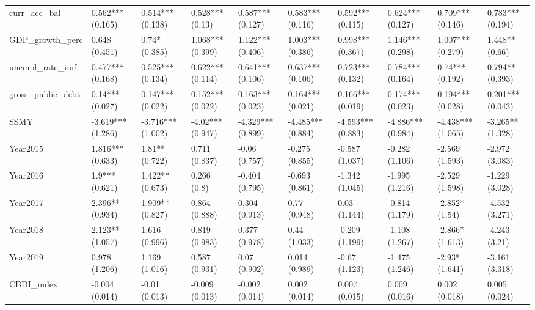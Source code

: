 \begin{table}[ht]
\begin{tabular}{llllllllll}
  curr\_acc\_bal & 0.562*** (0.165) & 0.514*** (0.138) & 0.528*** (0.13) & 0.587*** (0.127) & 0.583*** (0.116) & 0.592*** (0.115) & 0.624*** (0.127) & 0.709*** (0.146) & 0.783*** (0.194) \\ 
  GDP\_growth\_perc & 0.648 (0.451) & 0.74* (0.385) & 1.068*** (0.399) & 1.122*** (0.406) & 1.003*** (0.386) & 0.998*** (0.367) & 1.146*** (0.298) & 1.007*** (0.279) & 1.448** (0.66) \\ 
  unempl\_rate\_imf & 0.477*** (0.168) & 0.525*** (0.134) & 0.622*** (0.114) & 0.641*** (0.106) & 0.637*** (0.106) & 0.723*** (0.132) & 0.784*** (0.164) & 0.74*** (0.192) & 0.794** (0.393) \\ 
  gross\_public\_debt & 0.14*** (0.027) & 0.147*** (0.022) & 0.152*** (0.022) & 0.163*** (0.023) & 0.164*** (0.021) & 0.166*** (0.019) & 0.174*** (0.023) & 0.194*** (0.028) & 0.201*** (0.043) \\ 
  SSMY & -3.619*** (1.286) & -3.716*** (1.002) & -4.02*** (0.947) & -4.329*** (0.899) & -4.485*** (0.884) & -4.593*** (0.883) & -4.886*** (0.984) & -4.438*** (1.065) & -3.265** (1.328) \\ 
  Year2015 & 1.816*** (0.633) & 1.81** (0.722) & 0.711 (0.837) & -0.06 (0.757) & -0.275 (0.855) & -0.587 (1.037) & -0.282 (1.106) & -2.569 (1.593) & -2.972 (3.083) \\ 
  Year2016 & 1.9*** (0.621) & 1.422** (0.673) & 0.266 (0.8) & -0.404 (0.795) & -0.693 (0.861) & -1.342 (1.045) & -1.995 (1.216) & -2.529 (1.598) & -1.229 (3.028) \\ 
  Year2017 & 2.396** (0.934) & 1.909** (0.827) & 0.864 (0.888) & 0.304 (0.913) & 0.77 (0.948) & 0.03 (1.144) & -0.814 (1.179) & -2.852* (1.54) & -4.532 (3.271) \\ 
  Year2018 & 2.123** (1.057) & 1.616 (0.996) & 0.819 (0.983) & 0.377 (0.978) & 0.44 (1.033) & -0.209 (1.199) & -1.108 (1.267) & -2.866* (1.613) & -4.243 (3.21) \\ 
  Year2019 & 0.978 (1.206) & 1.169 (1.016) & 0.587 (0.931) & 0.07 (0.902) & 0.014 (0.989) & -0.67 (1.123) & -1.475 (1.246) & -2.93* (1.641) & -3.161 (3.318) \\ 
  CBDI\_index & -0.004 (0.014) & -0.01 (0.013) & -0.009 (0.013) & -0.002 (0.014) & 0.002 (0.014) & 0.007 (0.015) & 0.009 (0.016) & 0.002 (0.018) & 0.005 (0.024) \\ 
   \bottomrule
\end{tabular}
\endgroup
\end{table}
